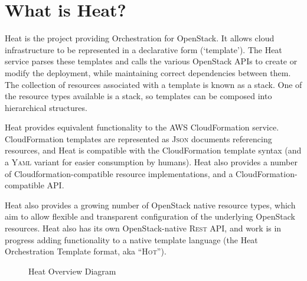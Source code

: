 \section{What is Heat?}

Heat is the project providing Orchestration for OpenStack. It allows cloud infrastructure to be represented in a declarative form (`template'). The Heat service parses these templates and calls the various OpenStack APIs to create or modify the deployment, while maintaining correct dependencies between them. The collection of resources associated with a template is known as a stack. One of the resource types available is a stack, so templates can be composed into hierarchical structures.

Heat provides equivalent functionality to the AWS CloudFormation service. CloudFormation templates are represented as \textsc{Json} documents referencing resources, and Heat is compatible with the CloudFormation template syntax (and a \textsc{Yaml} variant for easier consumption by humans).  Heat also provides a number of Cloudformation-compatible resource implementations, and a CloudFormation-compatible API.

Heat also provides a growing number of OpenStack native resource types, which aim to allow flexible and transparent configuration of the underlying OpenStack resources. Heat also has its own OpenStack-native \textsc{Rest} API, and work is in progress adding functionality to a native template language (the Heat Orchestration Template format, aka ``\textsc{Hot}'').

\begin{figure}[h!]
\caption{Heat Overview Diagram}\label{HeatOverviewFigure}
\centering
\end{figure}

